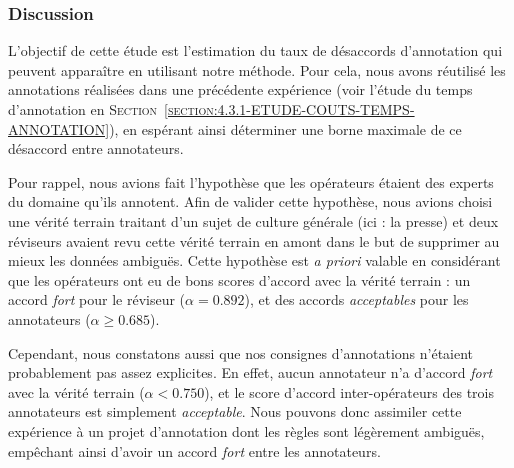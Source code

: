 		\subsubsection{Discussion}
		
			L'objectif de cette étude est l'estimation du taux de désaccords d'annotation qui peuvent apparaître en utilisant notre méthode.
			Pour cela, nous avons réutilisé les annotations réalisées dans une précédente expérience (voir l'étude du temps d'annotation en \textsc{Section~\ref{section:4.3.1-ETUDE-COUTS-TEMPS-ANNOTATION}}), en espérant ainsi déterminer une borne maximale de ce désaccord entre annotateurs.
			
			Pour rappel, nous avions fait l'hypothèse que les opérateurs étaient des experts du domaine qu'ils annotent.
			Afin de valider cette hypothèse, nous avions choisi une vérité terrain traitant d'un sujet de culture générale (ici : la presse) et deux réviseurs avaient revu cette vérité terrain en amont dans le but de supprimer au mieux les données ambiguës.
			Cette hypothèse est \textit{a priori} valable en considérant que les opérateurs ont eu de bons scores d'accord avec la vérité terrain : un accord \textit{fort} pour le réviseur ($\alpha = 0.892$), et des accords \textit{acceptables} pour les annotateurs ($\alpha \geq 0.685$).
			
			Cependant, nous constatons aussi que nos consignes d'annotations n'étaient probablement pas assez explicites.
			En effet, aucun annotateur n'a d'accord \textit{fort} avec la vérité terrain ($\alpha < 0.750$), et le score d'accord inter-opérateurs des trois annotateurs est simplement \textit{acceptable}.
			Nous pouvons donc assimiler cette expérience à un projet d'annotation dont les règles sont légèrement ambiguës, empêchant ainsi d'avoir un accord \textit{fort} entre les annotateurs.
			

